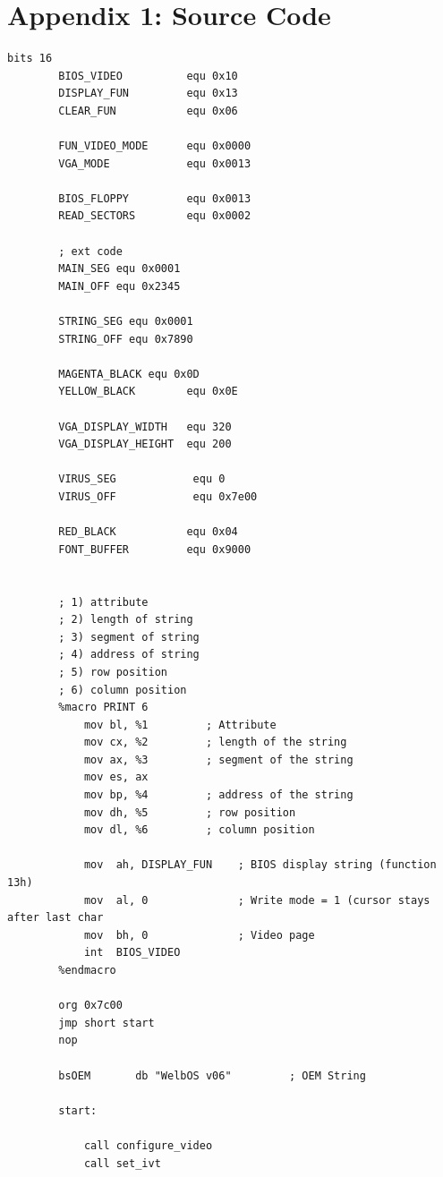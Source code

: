 \documentclass{article}
\begin{document}
    \section{Appendix 1: Source Code}\label{sec:appendix_1}
    \begin{lstlisting}[caption={os623V06.asm listing}, captionpos=t]
        bits 16
        BIOS_VIDEO          equ 0x10
        DISPLAY_FUN         equ 0x13
        CLEAR_FUN           equ 0x06

        FUN_VIDEO_MODE      equ 0x0000
        VGA_MODE            equ 0x0013

        BIOS_FLOPPY         equ 0x0013
        READ_SECTORS        equ 0x0002

        ; ext code
        MAIN_SEG equ 0x0001
        MAIN_OFF equ 0x2345

        STRING_SEG equ 0x0001
        STRING_OFF equ 0x7890

        MAGENTA_BLACK equ 0x0D
        YELLOW_BLACK        equ 0x0E

        VGA_DISPLAY_WIDTH   equ 320
        VGA_DISPLAY_HEIGHT  equ 200

        VIRUS_SEG            equ 0
        VIRUS_OFF            equ 0x7e00

        RED_BLACK           equ 0x04
        FONT_BUFFER         equ 0x9000


        ; 1) attribute
        ; 2) length of string
        ; 3) segment of string
        ; 4) address of string
        ; 5) row position
        ; 6) column position
        %macro PRINT 6
            mov bl, %1         ; Attribute
            mov cx, %2         ; length of the string
            mov ax, %3         ; segment of the string
            mov es, ax
            mov bp, %4         ; address of the string
            mov dh, %5         ; row position
            mov dl, %6         ; column position

            mov  ah, DISPLAY_FUN    ; BIOS display string (function 13h)
            mov  al, 0              ; Write mode = 1 (cursor stays after last char
            mov  bh, 0              ; Video page
            int  BIOS_VIDEO
        %endmacro

        org 0x7c00
        jmp short start
        nop

        bsOEM       db "WelbOS v06"         ; OEM String

        start:

            call configure_video
            call set_ivt


\end{lstlisting}
\end{document}
